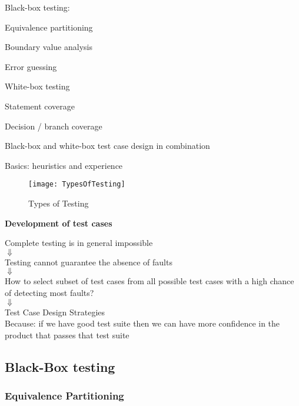 \begin{itemize*}
	\item Black-box testing:
	\begin{itemize*}
		\item Equivalence partitioning
		\item Boundary value analysis
		\item Error guessing
	\end{itemize*}
	\item White-box testing
	\begin{itemize*}
		\item Statement coverage
		\item Decision / branch coverage
	\end{itemize*}
	\item Black-box and white-box test case design in combination
	\item Basics: heuristics and experience
\end{itemize*}

\begin{figure}
	\centering
	\texttt{[image: TypesOfTesting]}
    \caption{Types of Testing}
\end{figure}

\textbf{Development of test cases}
\begin{center}
Complete testing is in general impossible\\ $\Downarrow$\\
Testing cannot guarantee the absence of faults\\ $\Downarrow$\\
How to select subset of test cases from all possible test cases with a high chance of detecting most faults?\\
$\Downarrow$\\
Test Case Design Strategies\\
Because: if we have good test suite then we can have more confidence in the product that passes that test suite
\end{center}

\subsection{Black-Box testing}

\subsubsection{Equivalence Partitioning}

